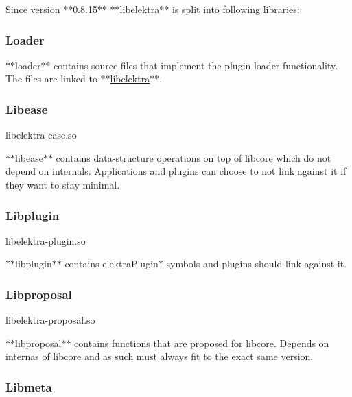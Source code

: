 Since version $\ast$$\ast$\hyperlink{doc_decisions_library_split_md}{0.8.15}$\ast$$\ast$ $\ast$$\ast$\hyperlink{md_src_libs_elektra_README_src_libs_elektra_README_md}{libelektra}$\ast$$\ast$ is split into following libraries\+:

 \subsubsection*{Loader}

$\ast$$\ast$loader$\ast$$\ast$ contains source files that implement the plugin loader functionality. The files are linked to $\ast$$\ast$\hyperlink{md_src_libs_elektra_README_src_libs_elektra_README_md}{libelektra}$\ast$$\ast$.

\subsubsection*{Libease}

\begin{DoxyVerb}libelektra-ease.so
\end{DoxyVerb}


$\ast$$\ast$libease$\ast$$\ast$ contains data-\/structure operations on top of libcore which do not depend on internals. Applications and plugins can choose to not link against it if they want to stay minimal.

\subsubsection*{Libplugin}

\begin{DoxyVerb}libelektra-plugin.so
\end{DoxyVerb}


$\ast$$\ast$libplugin$\ast$$\ast$ contains {\ttfamily elektra\+Plugin$\ast$} symbols and plugins should link against it.

\subsubsection*{Libproposal}

\begin{DoxyVerb}libelektra-proposal.so
\end{DoxyVerb}


$\ast$$\ast$libproposal$\ast$$\ast$ contains functions that are proposed for libcore. Depends on internas of libcore and as such must always fit to the exact same version.

\subsubsection*{Libmeta}

